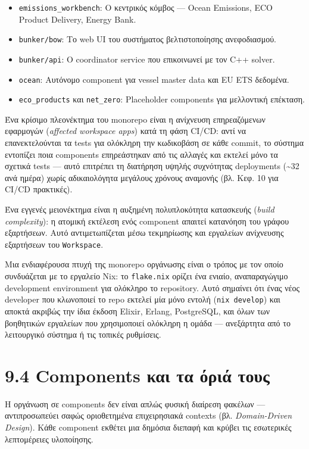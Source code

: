 \begin{itemize}
\tightlist
\item
  \texttt{emissions\_workbench}: Ο κεντρικός κόμβος --- Ocean Emissions,
  ECO Product Delivery, Energy Bank.
\item
  \texttt{bunker/bow}: Το web UI του συστήματος βελτιστοποίησης
  ανεφοδιασμού.
\item
  \texttt{bunker/api}: Ο coordinator service που επικοινωνεί με τον C++
  solver.
\item
  \texttt{ocean}: Αυτόνομο component για vessel master data και EU ETS
  δεδομένα.
\item
  \texttt{eco\_products} και \texttt{net\_zero}: Placeholder components
  για μελλοντική επέκταση.
\end{itemize}

Ένα κρίσιμο πλεονέκτημα του monorepo είναι η ανίχνευση επηρεαζόμενων
εφαρμογών (\emph{affected workspace apps}) κατά τη φάση CI/CD: αντί να
επανεκτελούνται τα tests για ολόκληρη την κωδικοβάση σε κάθε commit, το
σύστημα εντοπίζει ποια components επηρεάστηκαν από τις αλλαγές και
εκτελεί μόνο τα σχετικά tests --- αυτό επιτρέπει τη διατήρηση υψηλής
συχνότητας deployments (\textasciitilde32 ανά ημέρα) χωρίς αδικαιολόγητα
μεγάλους χρόνους αναμονής (βλ. Κεφ. 10 για CI/CD πρακτικές).

Ένα εγγενές μειονέκτημα είναι η αυξημένη πολυπλοκότητα κατασκευής
(\emph{build complexity}): η ατομική εκτέλεση ενός component απαιτεί
κατανόηση του γράφου εξαρτήσεων. Αυτό αντιμετωπίζεται μέσω τεκμηρίωσης
και εργαλείων ανίχνευσης εξαρτήσεων του \texttt{Workspace}.

Μια ενδιαφέρουσα πτυχή της monorepo οργάνωσης είναι ο τρόπος με τον
οποίο συνδυάζεται με το εργαλείο Nix: το \texttt{flake.nix} ορίζει ένα
ενιαίο, αναπαραγώγιμο development environment για ολόκληρο το
repository. Αυτό σημαίνει ότι ένας νέος developer που κλωνοποιεί το repo
εκτελεί μία μόνο εντολή (\texttt{nix\ develop}) και αποκτά ακριβώς την
ίδια έκδοση Elixir, Erlang, PostgreSQL, και όλων των βοηθητικών
εργαλείων που χρησιμοποιεί ολόκληρη η ομάδα --- ανεξάρτητα από το
λειτουργικό σύστημα ή τις τοπικές ρυθμίσεις.

\section{9.4 Components και τα όριά
τους}\label{components-ux3baux3b1ux3b9-ux3c4ux3b1-ux3ccux3c1ux3b9ux3ac-ux3c4ux3bfux3c5ux3c2}

Η οργάνωση σε components δεν είναι απλώς φυσική διαίρεση φακέλων ---
αντιπροσωπεύει σαφώς οριοθετημένα επιχειρησιακά contexts (βλ.
\emph{Domain-Driven Design}). Κάθε component εκθέτει μια δημόσια διεπαφή
και κρύβει τις εσωτερικές λεπτομέρειες υλοποίησης.

